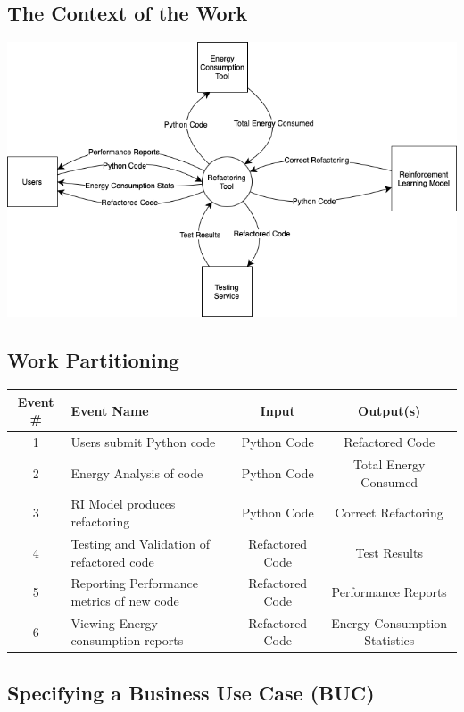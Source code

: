 \documentclass[12pt]{article}
\begin{document}
\subsection{The Context of the Work}

\includegraphics[scale=0.5]{../images/WorkContextModel.png}

\subsection{Work Partitioning}

\scriptsize
\begin{tabular}{ |c|p{2.5cm}|c|c| }
  \hline
  Event \# & Event Name & Input & Output(s) \\
  \hline\hline

  1 & Users submit Python code & Python Code & Refactored Code \\
  2 & Energy Analysis of code & Python Code & Total Energy Consumed \\
  3 & RI Model produces refactoring & Python Code & Correct Refactoring \\
  4 & Testing and Validation of refactored code & Refactored Code & Test Results \\
  5 & Reporting Performance metrics of new code & Refactored Code & Performance Reports \\
  6 & Viewing Energy consumption reports & Refactored Code & Energy Consumption Statistics \\

  \hline
\end{tabular}

\subsection{Specifying a Business Use Case (BUC)}
\end{document}
